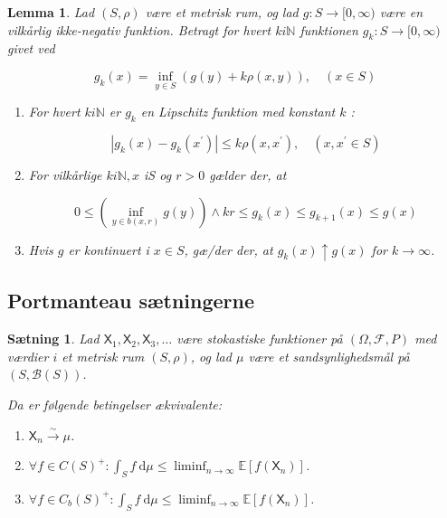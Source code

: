 \documentclass{article}
\newcommand{\1}{\mathbbm{1}}
\newcommand{\X}{\mathsf{X}}
\theoremstyle{boxed}
\newtheorem{lemma}[theorem]{Lemma}
\newtheorem{proposition}[theorem]{Sætning}
\begin{document}
\begin{theorem-box}
    \begin{lemma}
        Lad $(S, \rho)$ være et metrisk rum, og lad $g: S \rightarrow[0, \infty)$ være en vilkårlig ikke-negativ funktion. Betragt for hvert $k i \mathbb{N}$ funktionen $g_k: S \rightarrow[0, \infty)$ givet ved

$$
g_k(x)=\inf _{y \in S}(g(y)+k \rho(x, y)), \quad(x \in S)
$$
\begin{enumerate}
    \item[\textnormal{(i)}] For hvert $k i \mathbb{N}$ er $g_k$ en Lipschitz funktion med konstant $k$ :

    $$
    \left|g_k(x)-g_k\left(x^{\prime}\right)\right| \leq k \rho\left(x, x^{\prime}\right), \quad\left(x, x^{\prime} \in S\right)
    $$
    \item[\textnormal{(ii)}] For vilkårlige $k i \mathbb{N}, x$ iS og $r>0$ gælder der, at

    $$
    0 \leq\left(\inf _{y \in b(x, r)} g(y)\right) \wedge k r \leq g_k(x) \leq g_{k+1}(x) \leq g(x)
    $$
    \item[\textnormal{(iii)}] Hvis $g$ er kontinuert i $x \in S$, gæ/der der, at $g_k(x) \uparrow g(x)$ for $k \rightarrow \infty$.
\end{enumerate}
    \end{lemma}
\end{theorem-box}
\subsection{Portmanteau sætningerne}
\begin{theorem-box}
    \begin{proposition}
        Lad $\X_1, \X_2, \X_3, \ldots$ være stokastiske funktioner på $(\Omega, \mathcal{F}, P)$ med værdier $i$ et metrisk rum $(S, \rho)$, og lad $\mu$ være et sandsynlighedsmål på $(S, \mathcal{B}(S))$.

Da er følgende betingelser ækvivalente:
\begin{enumerate}
    \item[\textnormal{(i)}] $\X_n \xrightarrow{\sim} \mu$.
    \item[\textnormal{(ii)}] $\forall f \in C(S)^{+}: \int_S f \mathrm{~d} \mu \leq \liminf _{n \rightarrow \infty} \mathbb{E}\left[f\left(\X_n\right)\right]$.
    \item[\textnormal{(iii)}] $\forall f \in C_b(S)^{+}: \int_S f \mathrm{~d} \mu \leq \liminf _{n \rightarrow \infty} \mathbb{E}\left[f\left(\X_n\right)\right]$.
\end{enumerate}
    \end{proposition}
\end{theorem-box}
\end{document}
